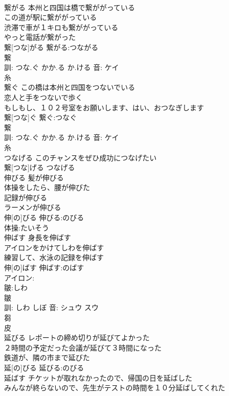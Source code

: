 \documentclass[8pt]{extreport}
\begin{document}
\begin{CJK}{UTF8}{min}
\\	繋がる	本州と四国は橋で繋ががっている 
\\	この道が駅に繋ががっている 
\\	渋滞で車が１キロも繋ががっている 
\\	やっと電話が繋がった 
\\	繋[つな]がる			繋がる:つながる
\\	繋 
\\	訓: つな.ぐ かか.る か.ける 音: ケイ 
\\	糸 
\\	繋ぐ	この橋は本州と四国をつないでいる 
\\	恋人と手をつないで歩く 
\\	もしもし、１０２号室をお願いします、はい、おつなぎします 
\\	繋[つな]ぐ			繋ぐ:つなぐ
\\	繋 
\\	訓: つな.ぐ かか.る か.ける 音: ケイ 
\\	糸 
\\	つなげる	このチャンスをぜひ成功につなげたい 
\\	繋[つな]げる			つなげる 
\\	伸びる	髪が伸びる 
\\	体操をしたら、腰が伸びた 
\\	記録が伸びる 
\\	ラーメンが伸びる 
\\	伸[の]びる			伸びる:のびる
\\	体操:たいそう
\\	伸ばす	身長を伸ばす 
\\	アイロンをかけてしわを伸ばす 
\\	練習して、水泳の記録を伸ばす 
\\	伸[の]ばす			伸ばす:のばす
\\	アイロン:
\\	皺:しわ
\\	皺 
\\	訓: しわ しぼ 音: シュウ スウ 
\\	芻 
\\	皮 
\\	延びる	レポートの締め切りが延びてよかった 
\\	２時間の予定だった会議が延びて３時間になった 
\\	鉄道が、隣の市まで延びた 
\\	延[の]びる			延びる:のびる
\\	延ばす	チケットが取れなかったので、帰国の日を延ばした 
\\	みんなが終らないので、先生がテストの時間を１０分延ばしてくれた 

\end{CJK}
\end{document}
